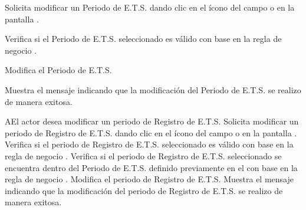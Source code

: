 \begin{UCtrayectoria}
	\UCpaso[\UCactor]  \label{IN-DAE-CU4.2:seleccionarPeriodo} Solicita modificar un Periodo de E.T.S. dando clic en el ícono {\IUCalendario} del campo  o  en la pantalla .    
	
	\UCpaso Verifica si el Periodo de E.T.S. seleccionado es válido con base en la regla de negocio . 
	
	\UCpaso Modifica el Periodo de E.T.S.
	
	\UCpaso Muestra el mensaje  indicando que la modificación del Periodo de E.T.S. se realizo de manera exitosa.
\end{UCtrayectoria}


\begin{UCtrayectoriaA}{A}{El actor desea modificar un periodo de Registro de E.T.S.}
	\UCpaso[\UCactor]  \label{IN-DAE-CU4.2:seleccionarRegistro} Solicita modificar un periodo de Registro de E.T.S. dando clic en el ícono {\IUCalendario} del campo  o  en la pantalla .
	\UCpaso Verifica si el periodo de Registro de E.T.S. seleccionado es válido con base en la regla de negocio . 
	\UCpaso Verifica si el periodo de Registro de E.T.S. seleccionado se encuentra dentro del
	Periodo de E.T.S. definido previamente en el  con base en la regla de negocio . 
	\UCpaso Modifica el periodo de Registro de E.T.S.
	\UCpaso Muestra el mensaje  indicando que la modificación del periodo de Registro de E.T.S. se realizo de manera exitosa.
\end{UCtrayectoriaA}

